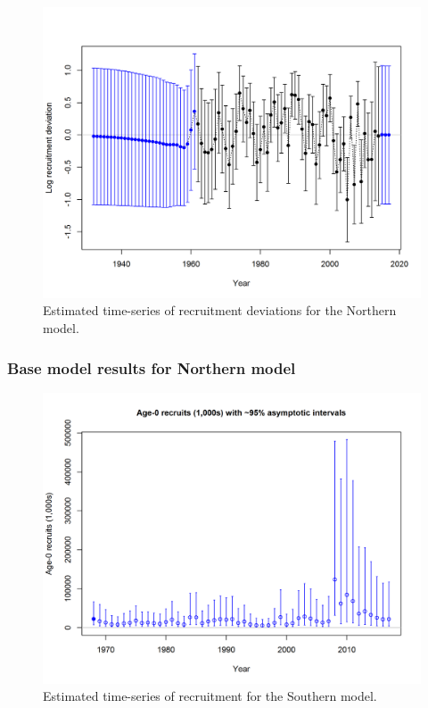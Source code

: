 \documentclass[12pt,]{article}
\begin{document}
\begin{figure}[htbp]
\centering
\includegraphics{r4ss/plots_mod1/recdevs2_withbars.png}
\caption{Estimated time-series of recruitment deviations for the
Northern model. \label{fig:recdevs1}}
\end{figure}

\FloatBarrier

\newpage

\subsubsection{Base model results for Northern
model}\label{base-model-results-for-northern-model}

\begin{figure}[htbp]
\centering
\includegraphics{r4ss/plots_mod2/ts11_Age-0_recruits_(1000s)_with_95_asymptotic_intervals.png}
\caption{Estimated time-series of recruitment for the Southern model.
\label{fig:recruits2}}
\end{figure}
\end{document}
